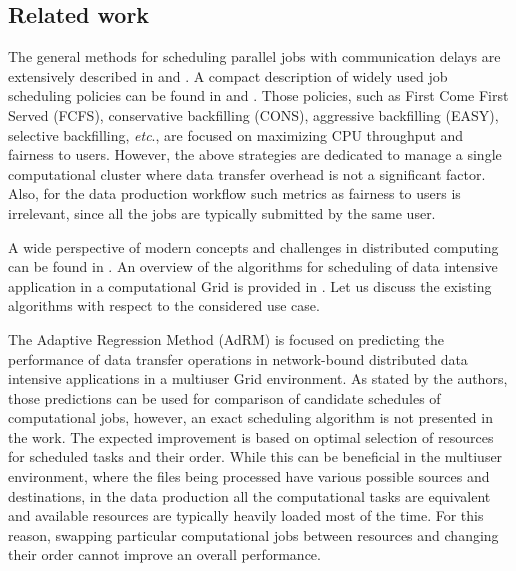 \documentclass{svjour3}                     %
\begin{document}
\subsection{Related work}
The general methods for scheduling parallel jobs with communication delays are extensively described in  \cite{bookDrozdovski} and \cite{sinnen2007task}. A compact description of widely used job scheduling policies can be found in \cite{Klusacek} and \cite{srinivasan2002selective}. Those policies, such as First Come First Served (FCFS), conservative backfilling (CONS), aggressive backfilling (EASY), selective backfilling, \textit{etc}., are focused on maximizing CPU throughput and fairness to users.  However, the above strategies are dedicated to manage a single computational cluster where data transfer overhead is not a significant factor. Also, for the data production workflow such metrics as fairness to users is irrelevant, since all the jobs are typically submitted by the same user.

A wide perspective of modern concepts and challenges in distributed computing can be found in \cite{hwang2013distributed}. An overview of the algorithms for scheduling of data intensive application in a computational Grid is provided in \cite{Magoules}.  %
Let us discuss the existing algorithms with respect to the considered use case.

%

The Adaptive Regression Method (AdRM) \cite{AdRM} is focused on predicting the performance of data transfer operations in network-bound distributed data intensive applications in a multiuser Grid environment. As stated by the authors, those predictions can be used for comparison of candidate schedules of computational jobs, however, an exact scheduling algorithm is not presented in the work. The expected improvement is based on optimal selection of resources for scheduled tasks and their order. While this can be beneficial in the multiuser environment, where the files being processed have various possible sources and destinations, in the data production all the computational tasks are equivalent  and  available resources are typically heavily loaded most of the time. For this reason, swapping particular computational jobs between resources and changing their order cannot improve an overall performance.
\end{document}
